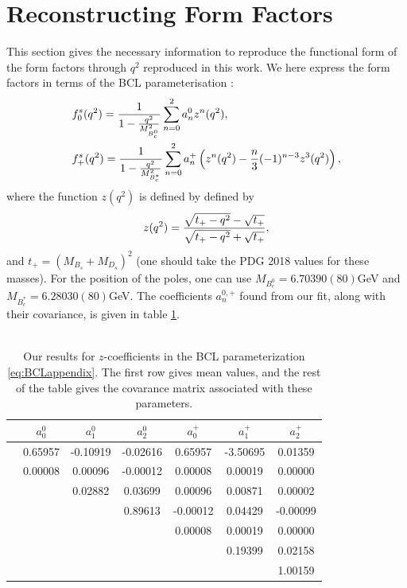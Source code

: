 \section{Reconstructing Form Factors}
\label{sec:reconstructing_formfactors}

This section gives the necessary information to reproduce the functional form of the form factors through $q^2$ reproduced in this work. We here express the form factors in terms of the BCL parameterisation \cite{Bourrely:2008za}:
\begin{align}
  \label{eq:BCLappendix}
  &f^s_0(q^2) = {1\over 1 - {q^2\over M_{B_c^0}^2} } \sum_{n=0}^{2} a_n^0 z^n(q^2), \\
  \nonumber
  &f^s_+(q^2) = {1\over 1 - {q^2\over M_{B_c^*}^2} } \sum_{n=0}^{2} a_n^+ \left( z^n(q^2) - {n\over 3} (-1)^{n-3} z^3(q^2) \right), \nonumber
\end{align}
where the function $z(q^2)$ is defined by defined by
\begin{align}
  z(q^2) = {\sqrt{t_+ - q^2} - \sqrt{t_+} \over \sqrt{t_+ - q^2} + \sqrt{t_+} },
\end{align}
and $t_+ = (M_{B_s}+M_{D_s})^2$ (one should take the PDG 2018 values for these masses). For the position of the poles, one can use $M_{B_c^0} = 6.70390(80)$GeV and $M_{B_c^*} = 6.28030(80)$GeV. The coefficients $a_n^{0,+}$ found from our fit, along with their covariance, is given in table \ref{tab:coeffs}. \\ \\

\begin{table}[htb!]
  \begin{center}
    \begin{tabular}{ c c c c c c c }
      \hline
      & $a^0_0$ & $a^0_1$ & $a^0_2$ & $a^+_0$ & $a^+_1$ & $a^+_2$\\ [0.5ex]
      \hline
      & 0.65957 & -0.10919 & -0.02616 & 0.65957 & -3.50695 & 0.01359\\ [1ex]
      \hline
      & 0.00008 & 0.00096 & -0.00012 & 0.00008 & 0.00019 & 0.00000\\ [1ex]
      &  & 0.02882 & 0.03699 & 0.00096 & 0.00871 & 0.00002\\ [1ex]
      &  &  & 0.89613 & -0.00012 & 0.04429 & -0.00099\\ [1ex]
      &  &  &  & 0.00008 & 0.00019 & 0.00000\\ [1ex]
      &  &  &  &  & 0.19399 & 0.02158\\ [1ex]
      &  &  &  &  &  & 1.00159\\ [1ex]
      \hline
    \end{tabular}
    \caption{Our results for $z$-coefficients in the BCL parameterization \eqref{eq:BCLappendix}. The first row gives mean values, and the rest of the table gives the covarance matrix associated with these parameters. \label{tab:coeffs}}
  \end{center}
\end{table}


